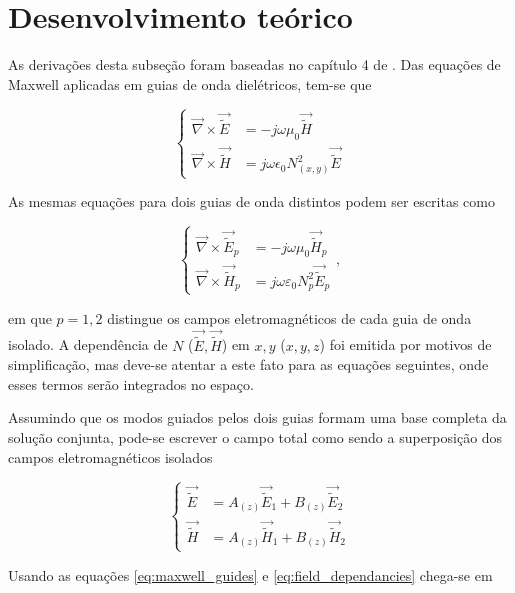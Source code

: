 \documentclass[final,12pt,times,twocolumn]{elsarticle}
\newcommand{\diverg}{\vec{\nabla}}
\newcommand{\tildee}{ \vec{\tilde{E}}}
\newcommand{\tildeh}{ \vec{\tilde{H}}}
\newcommand{\epsz}{\varepsilon_0}
\newcommand{\muz}{\mu_0}
\begin{document}
\section{Desenvolvimento teórico}
\label{sec:teoria}

As derivações desta subseção foram baseadas no capítulo 4 de \cite{okamoto}. Das equações de Maxwell aplicadas em guias de onda dielétricos, tem-se que

\begin{equation}
    \left\{
    \begin{split}
        \diverg \times \tildee &= -j\omega\mu_0\tildeh \\
        \diverg\times \tildeh &= j\omega\epsilon_0N_{(x,y)}^2\tildee
    \end{split}\right.
    \label{eq:maxwell_guides}
\end{equation}

As mesmas equações para dois guias de onda distintos podem ser escritas como

\begin{equation}
    \left\{
    \begin{split}
        \diverg \times \tildee_p &= -j\omega\muz\tildeh_p \\
        \diverg\times \tildeh_p &= j\omega\epsz N_p^2\tildee_p
    \end{split}\right. ,
    \label{eq:maxwell_pguides}
\end{equation}

\noindent em que $p=1,2$ distingue os campos eletromagnéticos de cada guia de onda isolado. A dependência de $N$ ($\tildee,\tildeh$) em $x,y$ ($x,y,z$) foi emitida por motivos de simplificação, mas deve-se atentar a este fato para as equações seguintes, onde esses termos serão integrados no espaço.

Assumindo que os modos guiados pelos dois guias formam uma base completa da solução conjunta, pode-se escrever o campo total como sendo a superposição dos campos eletromagnéticos isolados

\begin{equation}
    \left\{
    \begin{split}
        \tildee &= A_{(z)}\tildee_1 + B_{(z)}\tildee_2 \\
        \tildeh &= A_{(z)}\tildeh_1 + B_{(z)}\tildeh_2
    \end{split}
    \right.
    \label{eq:field_dependancies}
\end{equation}

Usando as equações \eqref{eq:maxwell_guides} e \eqref{eq:field_dependancies} chega-se em
\end{document}
